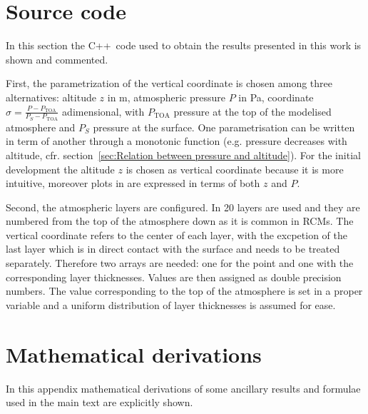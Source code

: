 \documentclass[a4paper,10pt,twocolumn,\classoptions]{article}
\newcommand{\cpp}{C++}
\newcommand{\PTOA}{P_\text{TOA}}
\begin{document}
\newpage
\appendix

\onecolumn
\section{Source code}
In this section the \cpp\ code used to obtain the results presented in this work is shown and commented.

First, the parametrization of the vertical coordinate is chosen among three alternatives: altitude $z$ in \unit{\metre}, atmospheric pressure $P$ in \unit{\pascal}, coordinate $\sigma = \frac{P - \PTOA}{P_S - \PTOA}$ adimensional, with $\PTOA$ pressure at the top of the modelised atmosphere and $P_S$ pressure at the surface. One parametrisation can be written in term of another through a monotonic function (e.g. pressure decreases with altitude, cfr. section~\ref{sec:Relation between pressure and altitude}). For the initial development the altitude $z$ is chosen as vertical coordinate because it is more intuitive, moreover plots in \cite{TTAPS-I} are expressed in terms of both $z$ and $P$.

Second, the atmospheric layers are configured. In \cite{TTAPS-I} 20 layers are used and they are numbered from the top of the atmosphere down as it is common in RCMs. The vertical coordinate refers to the center of each layer, with the excpetion of the last layer which is in direct contact with the surface and needs to be treated separately. %
Therefore two arrays are needed: one for the point and one with the corresponding layer thicknesses. Values are then assigned as double precision numbers. The value corresponding to the top of the atmosphere is set in a proper variable and a uniform distribution of layer thicknesses is assumed for ease.


\twocolumn



\section{Mathematical derivations}
In this appendix mathematical derivations of some ancillary results and formulae used in the main text are explicitly shown.
\end{document}
